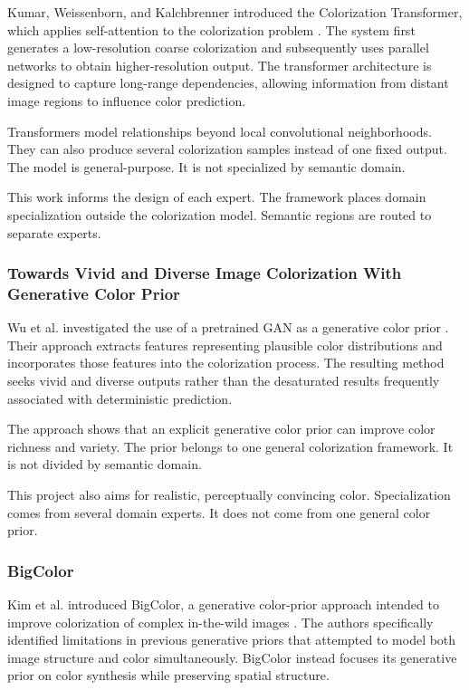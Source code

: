 \documentclass{FastFyp}
\begin{document}
Kumar, Weissenborn, and Kalchbrenner introduced the Colorization Transformer, which applies self-attention to the colorization problem \cite{ref5}. The system first generates a low-resolution coarse colorization and subsequently uses parallel networks to obtain higher-resolution output. The transformer architecture is designed to capture long-range dependencies, allowing information from distant image regions to influence color prediction.

Transformers model relationships beyond local convolutional neighborhoods. They can also produce several colorization samples instead of one fixed output. The model is general-purpose. It is not specialized by semantic domain.

This work informs the design of each expert. The framework places domain specialization outside the colorization model. Semantic regions are routed to separate experts.

\subsubsection{Towards Vivid and Diverse Image Colorization With Generative Color Prior}

Wu et al. investigated the use of a pretrained GAN as a generative color prior \cite{ref6}. Their approach extracts features representing plausible color distributions and incorporates those features into the colorization process. The resulting method seeks vivid and diverse outputs rather than the desaturated results frequently associated with deterministic prediction.

The approach shows that an explicit generative color prior can improve color richness and variety. The prior belongs to one general colorization framework. It is not divided by semantic domain.

This project also aims for realistic, perceptually convincing color. Specialization comes from several domain experts. It does not come from one general color prior.

\subsubsection{BigColor}

Kim et al. introduced BigColor, a generative color-prior approach intended to improve colorization of complex in-the-wild images \cite{ref7}. The authors specifically identified limitations in previous generative priors that attempted to model both image structure and color simultaneously. BigColor instead focuses its generative prior on color synthesis while preserving spatial structure.
\end{document}
